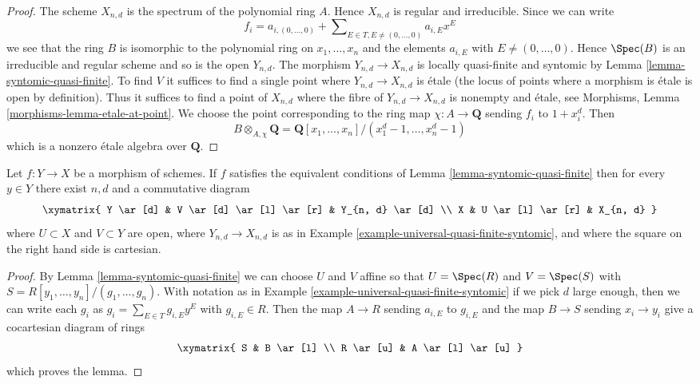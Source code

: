 \begin{proof}
The scheme $X_{n, d}$ is the spectrum of the polynomial ring $A$.
Hence $X_{n, d}$ is regular and irreducible. Since we can write
$$
f_i = a_{i, (0, \ldots, 0)} +
\sum\nolimits_{E \in T, E \not = (0, \ldots, 0)} a_{i, E} x^E
$$
we see that the ring $B$ is isomorphic to the polynomial ring
on $x_1, \ldots, x_n$ and the elements $a_{i, E}$ with
$E \not = (0, \ldots, 0)$. Hence $\Spec(B)$ is an irreducible and
regular scheme and so is the open $Y_{n, d}$. The morphism
$Y_{n, d} \to X_{n, d}$ is locally quasi-finite and syntomic by
Lemma \ref{lemma-syntomic-quasi-finite}. To find $V$ it suffices
to find a single point where $Y_{n, d} \to X_{n, d}$ is \'etale
(the locus of points where a morphism is \'etale is open by
definition). Thus it suffices to find a point of $X_{n, d}$
where the fibre of $Y_{n, d} \to X_{n, d}$ is nonempty and \'etale, see
Morphisms, Lemma \ref{morphisms-lemma-etale-at-point}. We choose
the point corresponding to the ring map $\chi : A \to \mathbf{Q}$
sending $f_i$ to $1 + x_i^d$. Then
$$
B \otimes_{A, \chi} \mathbf{Q} =
\mathbf{Q}[x_1, \ldots, x_n]/(x_1^d - 1, \ldots, x_n^d - 1)
$$
which is a nonzero \'etale algebra over $\mathbf{Q}$.
\end{proof}

\begin{lemma}
\label{lemma-locally-comes-from-universal}
Let $f : Y \to X$ be a morphism of schemes. If $f$ satisfies the equivalent
conditions of Lemma \ref{lemma-syntomic-quasi-finite} then for every
$y \in Y$ there exist $n, d$ and a commutative diagram
$$
\xymatrix{
Y \ar[d] &
V \ar[d] \ar[l] \ar[r] &
Y_{n, d} \ar[d] \\
X & U \ar[l] \ar[r] &
X_{n, d}
}
$$
where $U \subset X$ and $V \subset Y$ are open, where $Y_{n, d} \to X_{n, d}$
is as in Example \ref{example-universal-quasi-finite-syntomic}, and
where the square on the right hand side is cartesian.
\end{lemma}

\begin{proof}
By Lemma \ref{lemma-syntomic-quasi-finite}
we can choose $U$ and $V$ affine so that
$U = \Spec(R)$ and $V = \Spec(S)$ with
$S = R[y_1, \ldots, y_n]/(g_1, \ldots, g_n)$.
With notation as in Example \ref{example-universal-quasi-finite-syntomic}
if we pick $d$ large enough, then we can write each $g_i$ as
$g_i = \sum_{E \in T} g_{i, E}y^E$ with $g_{i, E} \in R$.
Then the map $A \to R$ sending $a_{i, E}$ to $g_{i, E}$
and the map $B \to S$ sending $x_i \to y_i$ give a cocartesian
diagram of rings
$$
\xymatrix{
S & B \ar[l] \\
R \ar[u] & A \ar[l] \ar[u]
}
$$
which proves the lemma.
\end{proof}











